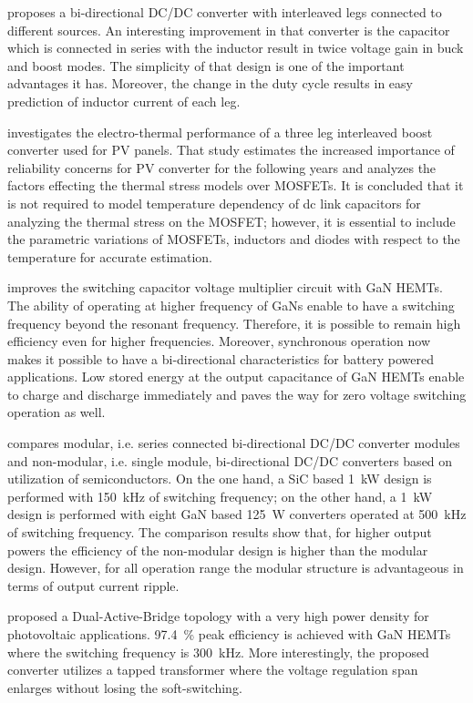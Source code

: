 \documentclass[energies,article,submit,moreauthors,pdftex]{Definitions/mdpi}
\begin{document}
\cite{Zhu2020} proposes a bi-directional DC/DC converter with interleaved legs connected to different sources. An interesting improvement in that converter is the capacitor which is connected in series with the inductor result in twice voltage gain in buck and boost modes. The simplicity of that design is one of the important advantages it has. Moreover, the change in the duty cycle results in easy prediction of inductor current of each leg.

\cite{VanDeSande2020} investigates the electro-thermal performance of a three leg interleaved boost converter used for PV panels. That study estimates the increased importance of reliability concerns for PV converter for the following years and analyzes the factors effecting the thermal stress models over MOSFETs. It is concluded that it is not required to model temperature dependency of dc link capacitors for analyzing the thermal stress on the MOSFET; however, it is essential to include the parametric variations of MOSFETs, inductors and diodes with respect to the temperature for accurate estimation.

\cite{Waradzyn2020} improves the switching capacitor voltage multiplier circuit with GaN HEMTs. The ability of operating at higher frequency of GaNs enable to have a switching frequency beyond the resonant frequency. Therefore, it is possible to remain high efficiency even for higher frequencies. Moreover, synchronous operation now makes it possible to have a bi-directional characteristics for battery powered applications. Low stored energy at the output capacitance of GaN HEMTs enable to charge and discharge immediately and paves the way for zero voltage switching operation as well.

\cite{Frivaldsky2020} compares modular, i.e. series connected bi-directional DC/DC converter modules and non-modular, i.e. single module, bi-directional DC/DC converters based on utilization of semiconductors. On the one hand, a SiC based 1~kW design is performed with 150~kHz of switching frequency; on the other hand, a 1~kW design is performed with eight GaN based 125~W converters operated at 500~kHz of switching frequency. The comparison results show that, for higher output powers the efficiency of the non-modular design is higher than the modular design. However, for all operation range the modular structure is advantageous in terms of output current ripple.

\cite{Jafari2020a} proposed a Dual-Active-Bridge topology with a very high power density for photovoltaic applications. 97.4~\% peak efficiency is achieved with GaN HEMTs where the switching frequency is 300~kHz. More interestingly, the proposed converter utilizes a tapped transformer \cite{Jafari2020b} where the voltage regulation span enlarges without losing the soft-switching.
\end{document}
